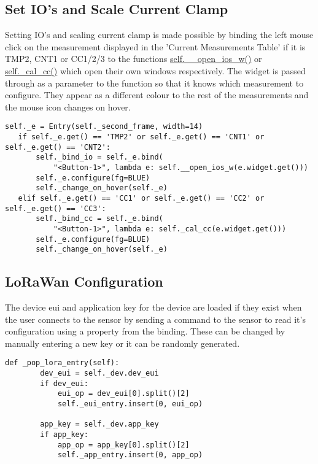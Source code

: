 \documentclass[a4paper,12pt, notitlepage]{article}
\begin{document}
\subsection{Set IO's and Scale Current Clamp}

Setting IO's and scaling current clamp is made possible by binding the left mouse click on the measurement displayed in the 'Current Measurements Table' if it is TMP2, CNT1 or CC1/2/3 to the functions \url{self.__open_ios_w()} or \url{self._cal_cc()} which open their own windows respectively. The widget is passed through as a parameter to the function so that it knows which measurement to configure. They appear as a different colour to the rest of the measurements and the mouse icon changes on hover.

\begin{lstlisting}[caption={A function to set pulsecount or one wire.},label={lst: exampIoSet}]
   self._e = Entry(self._second_frame, width=14)
   if self._e.get() == 'TMP2' or self._e.get() == 'CNT1' or self._e.get() == 'CNT2':
       self._bind_io = self._e.bind(
           "<Button-1>", lambda e: self.__open_ios_w(e.widget.get()))
       self._e.configure(fg=BLUE)
       self._change_on_hover(self._e)
   elif self._e.get() == 'CC1' or self._e.get() == 'CC2' or self._e.get() == 'CC3':
       self._bind_cc = self._e.bind(
           "<Button-1>", lambda e: self._cal_cc(e.widget.get()))
       self._e.configure(fg=BLUE)
       self._change_on_hover(self._e)
\end{lstlisting}

\subsection{LoRaWan Configuration}

The device eui and application key for the device are loaded if they exist when the user connects to the sensor by sending a command to the sensor to read it's configuration using a property from the binding. These can be changed by manually entering a new key or it can be randomly generated.

\begin{lstlisting}[caption={Reading the dev-eui and app-key and inserting into an entry box.},label={lst: exampLoraSet}]
    def _pop_lora_entry(self):
        dev_eui = self._dev.dev_eui
        if dev_eui:
            eui_op = dev_eui[0].split()[2]
            self._eui_entry.insert(0, eui_op)

        app_key = self._dev.app_key
        if app_key:
            app_op = app_key[0].split()[2]
            self._app_entry.insert(0, app_op)
\end{lstlisting}
\end{document}
